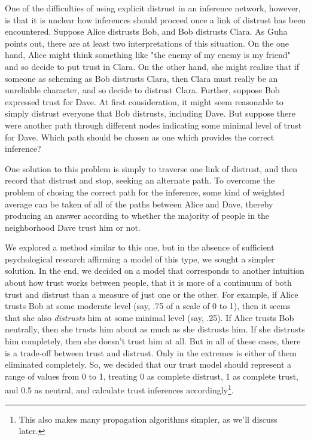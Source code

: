 \documentclass[onecolumn]{acm_proc_article-sp}
\begin{document}
One of the difficulties of using explicit distrust in an inference network, however, is that it is unclear how inferences should proceed once a link of distrust has been encountered.  Suppose Alice distrusts Bob, and Bob distrusts Clara.  As Guha points out\cite{guha04propagation}, there are at least two interpretations of this situation.  On the one hand, Alice might think something like "the enemy of my enemy is my friend" and so decide to put trust in Clara.  On the other hand, she might realize that if someone as scheming as Bob distrusts Clara, then Clara must really be an unreliable character, and so decide to distrust Clara.  Further, suppose Bob expressed trust for Dave.  At first consideration, it might seem reasonable to simply distrust everyone that Bob distrusts, including Dave.  But suppose there were another path through different nodes indicating some minimal level of trust for Dave.  Which path should be chosen as one which provides the correct inference?

One solution to this problem is simply to traverse one link of distrust, and then record that distrust and stop, seeking an alternate path.  To overcome the problem of chosing the correct path for the inference, some kind of weighted average can be taken of all of the paths between Alice and Dave, thereby producing an answer according to whether the majority of people in the neighborhood Dave trust him or not.

We explored a method similar to this one, but in the absence of sufficient psychological research affirming a model of this type, we sought a simpler solution.  In the end, we decided on a model that corresponds to another intuition about how trust works between people, that it is more of a continuum of both trust and distrust than a measure of just one or the other.  For example, if Alice trusts Bob at some moderate level (say, .75 of a scale of 0 to 1), then it seems that she also \textit{distrusts} him at some minimal level (say, .25).  If Alice trusts Bob neutrally, then she trusts him about as much as she distrusts him.  If she distrusts him completely, then she doesn't trust him at all.  But in all of these cases, there is a trade-off between trust and distrust.  Only in the extremes is either of them eliminated completely.  So, we decided that our trust model should represent a range of values from 0 to 1, treating 0 as complete distrust, 1 as complete trust, and 0.5 as neutral, and calculate trust inferences accordingly\footnote{This also makes many propagation algorithms simpler, as we'll discuss later.}.
\end{document}
